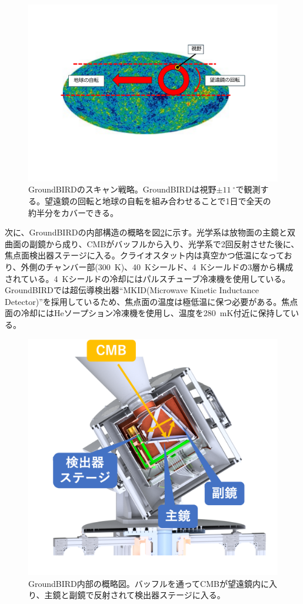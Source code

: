 \begin{figure}[htbp]
  \centering
  \includegraphics[width=0.8\columnwidth]{3_GB/figs/scan_strategy.pdf}
  \caption{GroundBIRDのスキャン戦略。GroundBIRDは視野$\pm \SI{11}{^{\circ}}$で観測する。望遠鏡の回転と地球の自転を組み合わせることで1日で全天の約半分をカバーできる。}
  \label{scan_strategy}
\end{figure}

次に、GroundBIRDの内部構造の概略を図\ref{GB_inside}に示す。光学系は放物面の主鏡と双曲面の副鏡から成り、CMBがバッフルから入り、光学系で2回反射させた後に、焦点面検出器ステージに入る。クライオスタット内は真空かつ低温になっており、外側のチャンバー部(\SI{300}{K})、\SI{40}{K}シールド、\SI{4}{K}シールドの3層から構成されている。\SI{4}{K}シールドの冷却にはパルスチューブ冷凍機を使用している。GroundBIRDでは超伝導検出器``MKID(Microwave Kinetic Inductance Detector)''を採用しているため、焦点面の温度は極低温に保つ必要がある。焦点面の冷却にはHeソープション冷凍機を使用し、温度を\SI{280}{mK}付近に保持している。

\begin{figure}[htbp]
  \centering
  \includegraphics[width=0.6\columnwidth]{3_GB/figs/gb_int.png}
  \caption{GroundBIRD内部の概略図。バッフルを通ってCMBが望遠鏡内に入り、主鏡と副鏡で反射されて検出器ステージに入る。}
  \label{GB_inside}
\end{figure}

